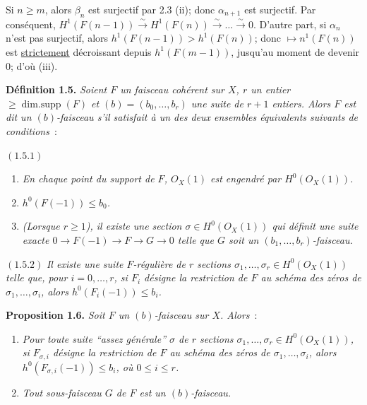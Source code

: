 
Si \(n\ge m\),
alors \(\beta_n\) est surjectif par 2.3 (ii); donc \(\alpha_{n+1}\) est surjectif. Par conséquent, \(H^1(F(n-1))\xrightarrow{\sim}H^1(F(n))\xrightarrow{\sim}\ldots\xrightarrow{\sim}0\). D'autre part, si \(\alpha_n\) n'est pas surjectif, alors \(h^1(F(n-1))>h^1(F(n))\); donc \(\mapsto n^1(F(n))\) est \uline{strictement} décroissant depuis \(h^1(F(m-1))\), jusqu'au moment de devenir \(0\); d'où (iii).

\textbf{Définition 1.5.} \emph{Soient \(F\) un faisceau cohérent sur \(X\), \(r\) un entier \(\ge\operatorname{dim{.}supp}(F)\) et \((b)=(b_0,\ldots,b_r)\) une suite de \(r+1\) entiers. Alors \(F\) est dit un \emph{\((b)\)-faisceau} s'il satisfait à un des deux ensembles équivalents suivants de conditions}~:

\((1.5.1)\)
\begin{enumerate}[label=(\roman*)]
\item \emph{En chaque point du support de \(F\), \({O}_X(1)\) est engendré par \(H^0({O}_X(1))\).}
\item \emph{\(h^0(F(-1))\le b_0\).}
\item \emph{(Lorsque \(r\ge1\)), il existe une section \(\sigma\in H^0({O}_X(1))\) qui définit une suite exacte \(0\to F(-1)\to F\to G\to0\) telle que \(G\) soit un \((b_1,\ldots,b_r)\)-faisceau.}
\end{enumerate}

\((1.5.2)\) \emph{Il existe une suite \(F\)-régulière de \(r\) sections \(\sigma_1,\ldots,\sigma_r\in H^0({O}_X(1))\) telle que, pour \(i=0,\ldots,r\), si \(F_i\) désigne la restriction de \(F\) au schéma des zéros de \(\sigma_1,\ldots,\sigma_i\), alors \(h^0(F_i(-1))\le b_i\).}

\textbf{Proposition 1.6.} \emph{Soit \(F\) un \((b)\)-faisceau sur \(X\). Alors}~:
\begin{enumerate}[label=(\roman*)]
\item \emph{Pour toute suite ``assez générale'' \(\sigma\) de \(r\) sections \(\sigma_1,\ldots,\sigma_r\in H^0({O}_X(1))\), si \(F_{\sigma,i}\) désigne la restriction de \(F\) au schéma des zéros de \(\sigma_1,\ldots,\sigma_i\), alors \(h^0(F_{\sigma,i}(-1))\le b_i\), où \(0\le i\le r\).}
\item \emph{Tout sous-faisceau \(G\) de \(F\) est un \((b)\)-faisceau.}
\end{enumerate}

